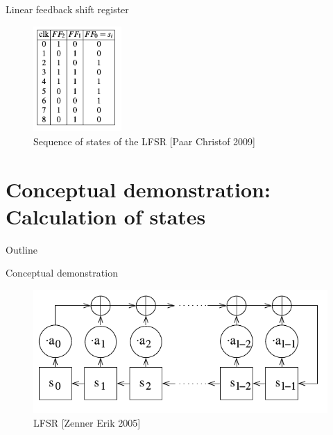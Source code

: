 \documentclass[]{beamer}
\begin{document}
\begin{frame}[t]{Linear feedback shift register}
\begin{figure}[ht]
\centering
\includegraphics[width=0.3\textwidth]{lfsr_sample_states.png}
\caption{Sequence of states of the LFSR [Paar Christof 2009]}
\label{fig:lfsr_sample_states}
\end{figure}
\end{frame}

\section{Conceptual demonstration: Calculation of states}

\begin{frame}[t]{Outline}
\tableofcontents[currentsection]
\end{frame}


\begin{frame}[t]{Conceptual demonstration}
\begin{figure}[ht]
\centering
\includegraphics[width=\textwidth]{lfsr.png}
\caption{LFSR [Zenner Erik 2005]}
\label{fig:lfsr}
\end{figure}
\end{frame}
\end{document}
